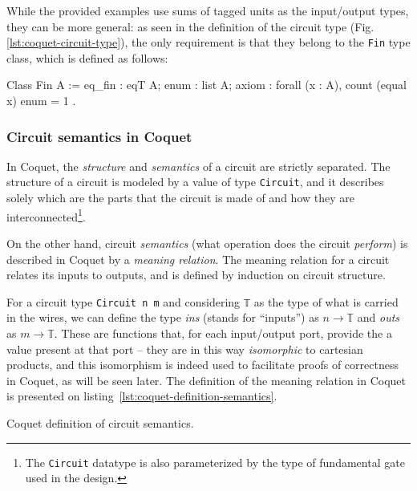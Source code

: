             While the provided examples use sums of tagged units as the input/output types, they can
            be more general: as seen in the definition of the circuit type (Fig.
            \ref{lst:coquet-circuit-type}), the only requirement is that they belong to the
            \texttt{Fin} type class, which is defined as follows:

            \begin{coqcode}
        Class Fin A := {
            eq_fin : eqT A;
            enum   : list A;
            axiom  : forall (x : A), count (equal x) enum = 1
        }.
            \end{coqcode}


        \subsubsection{Circuit semantics in Coquet}
        \label{subsubsec:coquet-semantics}
            In Coquet, the \emph{structure} and \emph{semantics} of a circuit are strictly
            separated. The structure of a circuit is modeled by a value of type \texttt{Circuit},
            and it describes solely which are the parts that the circuit is made of and how they are
            interconnected\footnote{The \texttt{Circuit} datatype is also parameterized by the type
                of fundamental gate used in the design.}.

            On the other hand, circuit \emph{semantics} (what operation does the circuit
            \emph{perform}) is described in Coquet by a \emph{meaning relation}. The meaning
            relation for a circuit relates its inputs to outputs, and is defined by induction on
            circuit structure.

            For a circuit type \texttt{Circuit n m} and considering \texttt{𝕋} as the type of
            what is carried in the wires, we can define the type \emph{ins} (stands for
            ``inputs'') as $n \rightarrow 𝕋$ and \emph{outs} as $m \rightarrow 𝕋$. These are
            functions that, for each input/output port, provide the a value present at that port
            -- they are in this way \emph{isomorphic} to cartesian products, and this isomorphism
            is indeed used to facilitate proofs of correctness in Coquet, as will be seen later.
            The definition of the meaning relation in Coquet is presented on
            listing~\ref{lst:coquet-definition-semantics}.

            \begin{listing}[h!]
                \caption{Coquet definition of circuit semantics.
                    \label{lst:coquet-definition-semantics}}
            \end{listing}

